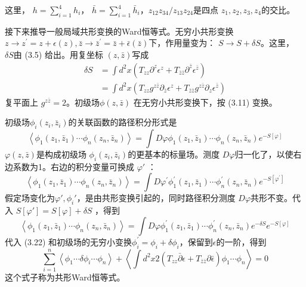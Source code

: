 这里， $h=\sum_{i=1}^4h_i $， $\bar{h}=\sum_{i=1}^4\bar{h}_i ， z_{12}z_{34}/z_{13}z_{24} $是四点 $z_1,z_2,z_3,z_4 $的交比。

接下来推导一般局域共形变换的Ward恒等式。无穷小共形变换$ z \rightarrow z^{\prime}=z+\epsilon(z), \bar{z}\to\bar{z}^{\prime}=\bar{z}+\bar{\epsilon}(\bar{z}) $下，作用量变为： $S\to S+\delta S $。这里， $\delta S $由 (3.5) 给出。用复坐标 $(z,\bar{z}) $写成
\begin{equation}
\begin{aligned} \delta S &=\int d^{2} x\left(T_{z z} \partial^{z} \epsilon^{z}+T_{\bar{z} \bar{z}} \partial^{\bar{z}} \epsilon^{\bar{z}}\right) \\ &=\int d^{2} x\left(T_{z z} g^{z \bar{z}} \partial_{\bar{z}} \epsilon^{z}+T_{\bar{z} \bar{z}} g^{z \bar{z}} \partial_{z} \epsilon^{\bar{z}}\right) \end{aligned}
\end{equation}
复平面上 $g^{z\bar{z}}=2 。初级场 \phi(z,\bar{z})$ 在无穷小共形变换下，按 (3.11) 变换。

初级场$ \phi_i(z_i,\bar{z}_i) $的关联函数的路径积分形式是
\[
\left\langle\phi_{1}\left(z_{1}, \bar{z}_{1}\right) \cdots \phi_{n}\left(z_{n}, \bar{z}_{n}\right)\right\rangle=\int D \varphi \phi_{1}\left(z_{1}, \bar{z}_{1}\right) \cdots \phi_{n}\left(z_{n}, \bar{z}_{n}\right) e^{-S[\varphi]}
\]
$\varphi(z,\bar{z}) $是构成初级场 $\phi_i(z_i,\bar{z}_i) $的更基本的标量场。测度 $D\varphi $归一化了，以使右边系数为1。右边的积分变量可换成 $\varphi'$ ：
\[
\left\langle\phi_{1}\left(z_{1}, \bar{z}_{1}\right) \cdots \phi_{n}\left(z_{n}, \bar{z}_{n}\right)\right\rangle=\int D \varphi^{\prime} \phi_{1}^{\prime}\left(z_{1}, \bar{z}_{1}\right) \cdots \phi_{n}^{\prime}\left(z_{n}, \bar{z}_{n}\right) e^{-S\left[\varphi^{\prime}\right]}
\]
假定场变化为$ \varphi',\phi_i' $，是由共形变换引起的，同时路径积分测度 $D\varphi $共形不变。代入 $S[\varphi']=S[\varphi]+\delta S$ ，得到
\[
\left\langle\phi_{1}\left(z_{1}, \bar{z}_{1}\right) \cdots \phi_{n}\left(z_{n}, \bar{z}_{n}\right)\right\rangle=\int D \varphi \phi_{1}^{\prime}\left(z_{1}, \bar{z}_{1}\right) \cdots \phi_{n}^{\prime}\left(z_{n}, \bar{z}_{n}\right) e^{-\delta S} e^{-S[\varphi]}
\]
代入 (3.22) 和初级场的无穷小变换$ \phi_{i}^{\prime}=\phi_{i}+\delta \phi_{i} $，保留到$ \epsilon $的一阶，得到
\begin{equation}
\sum_{i=1}^{n}\left\langle\phi_{1} \cdots \delta \phi_{i} \cdots \phi_{n}\right\rangle+\left\langle\int d^{2} x 2\left(T_{z z} \bar{\partial} \epsilon+T_{\bar{z} \bar{z}} \partial \bar{\epsilon}\right) \phi_{1} \cdots \phi_{n}\right\rangle=0
\end{equation}
这个式子称为共形Ward恒等式。


